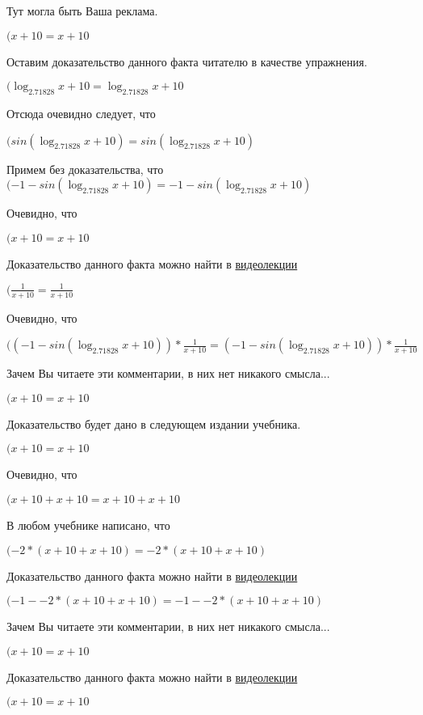 \documentclass[12pt,a4paper,fleqn]{article}
\theoremstyle{definition}
\begin{document}
Тут могла быть Ваша реклама.

$( x  +  10  =  x  +  10 $

Оставим доказательство данного факта читателю в качестве упражнения.

$(\log_{ 2.71828 }{ x  +  10 } = \log_{ 2.71828 }{ x  +  10 }$

Отсюда очевидно следует, что

$(sin(\log_{ 2.71828 }{ x  +  10 }) = sin(\log_{ 2.71828 }{ x  +  10 })$

Примем без доказательства, что
$( -1  - sin(\log_{ 2.71828 }{ x  +  10 }) =  -1  - sin(\log_{ 2.71828 }{ x  +  10 })$

Очевидно, что

$( x  +  10  =  x  +  10 $

Доказательство данного факта можно найти в \href{https://www.youtube.com/watch?v=dQw4w9WgXcQ}{видеолекции}

$(\frac{ 1 }{ x  +  10 }
 = \frac{ 1 }{ x  +  10 }
$

Очевидно, что

$(( -1  - sin(\log_{ 2.71828 }{ x  +  10 })) * \frac{ 1 }{ x  +  10 }
 = ( -1  - sin(\log_{ 2.71828 }{ x  +  10 })) * \frac{ 1 }{ x  +  10 }
$

Зачем Вы читаете эти комментарии, в них нет никакого смысла...

$( x  +  10  =  x  +  10 $

Доказательство будет дано в следующем издании учебника.

$( x  +  10  =  x  +  10 $

Очевидно, что

$( x  +  10  +  x  +  10  =  x  +  10  +  x  +  10 $

В любом учебнике написано, что

$( -2  * ( x  +  10  +  x  +  10 ) =  -2  * ( x  +  10  +  x  +  10 )$

Доказательство данного факта можно найти в \href{https://www.youtube.com/watch?v=dQw4w9WgXcQ}{видеолекции}

$( -1  -  -2  * ( x  +  10  +  x  +  10 ) =  -1  -  -2  * ( x  +  10  +  x  +  10 )$

Зачем Вы читаете эти комментарии, в них нет никакого смысла...

$( x  +  10  =  x  +  10 $

Доказательство данного факта можно найти в \href{https://www.youtube.com/watch?v=dQw4w9WgXcQ}{видеолекции}

$( x  +  10  =  x  +  10 $
\end{document}
